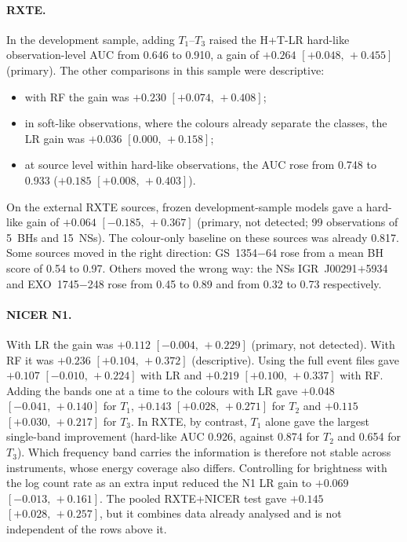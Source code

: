 \documentclass[11pt,a4paper]{article}
\newcommand{\ci}[2]{$[#1,\,#2]$}
\newcommand{\HT}{\textsf{H+T}}
\begin{document}
\paragraph{RXTE.}
In the development sample, adding $T_1$--$T_3$ raised the \HT-LR hard-like observation-level AUC from 0.646 to 0.910, a
gain of $+0.264$ \ci{+0.048}{+0.455} (primary). The other comparisons in this sample were descriptive:
\begin{itemize}\setlength\itemsep{1pt}
\item with RF the gain was $+0.230$ \ci{+0.074}{+0.408};
\item in soft-like observations, where the colours already separate the classes, the LR gain was $+0.036$
\ci{0.000}{+0.158};
\item at source level within hard-like observations, the AUC rose from 0.748 to 0.933 ($+0.185$ \ci{+0.008}{+0.403}).
\end{itemize}
On the external RXTE sources, frozen development-sample models gave a hard-like gain of $+0.064$ \ci{-0.185}{+0.367}
(primary, not detected; 99 observations of 5~BHs and 15~NSs). The colour-only baseline on these sources was already 0.817.
Some sources moved in the right direction: GS~1354$-$64 rose from a mean BH score of 0.54 to 0.97. Others moved the wrong
way: the NSs IGR~J00291$+$5934 and EXO~1745$-$248 rose from 0.45 to 0.89 and from 0.32 to 0.73 respectively.

\paragraph{NICER N1.}
With LR the gain was $+0.112$ \ci{-0.004}{+0.229} (primary, not detected). With RF it was $+0.236$ \ci{+0.104}{+0.372}
(descriptive). Using the full event files gave $+0.107$ \ci{-0.010}{+0.224} with LR and $+0.219$ \ci{+0.100}{+0.337} with
RF. Adding the bands one at a time to the colours with LR gave $+0.048$ \ci{-0.041}{+0.140} for $T_1$, $+0.143$
\ci{+0.028}{+0.271} for $T_2$ and $+0.115$ \ci{+0.030}{+0.217} for $T_3$. In RXTE, by contrast, $T_1$ alone gave the
largest single-band improvement (hard-like AUC 0.926, against 0.874 for $T_2$ and 0.654 for $T_3$). Which frequency band
carries the information is therefore not stable across instruments, whose energy coverage also differs. Controlling for
brightness with the log count rate as an extra input reduced the N1 LR gain to $+0.069$ \ci{-0.013}{+0.161}. The pooled
RXTE+NICER test gave $+0.145$ \ci{+0.028}{+0.257}, but it combines data already analysed and is not independent of the
rows above it.
\end{document}
